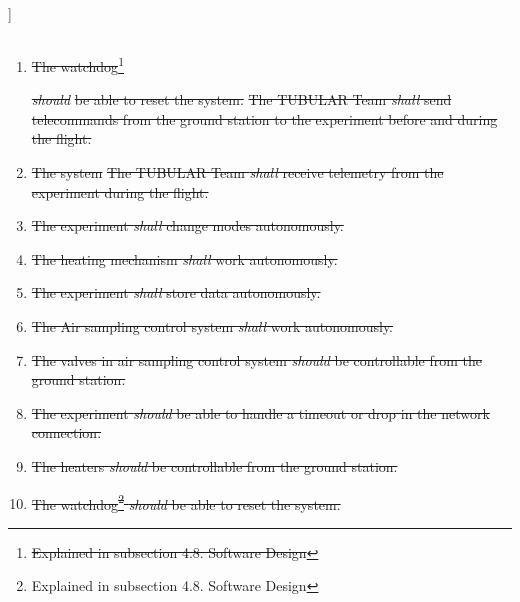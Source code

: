 ]\documentclass[a4paper,12pt,twoside]{article}
\providecommand{\DIFaddtex}[1]{{\protect\color{blue}\uwave{#1}}} %
\providecommand{\DIFdeltex}[1]{{\protect\color{red}\sout{#1}}}                      %
\providecommand{\DIFaddbegin}{} %
\providecommand{\DIFaddend}{} %
\providecommand{\DIFdelbegin}{} %
\providecommand{\DIFdelend}{} %
\providecommand{\DIFadd}[1]{\texorpdfstring{\DIFaddtex{#1}}{#1}} %
\providecommand{\DIFdel}[1]{\texorpdfstring{\DIFdeltex{#1}}{}} %
\newcommand{\DIFscaledelfig}{0.5}
\newlength{\DIFdelgraphicswidth} %
\newlength{\DIFdelgraphicsheight} %
\newcommand{\DIFaddincludegraphics}[2][]{{\color{blue}\fbox{\DIFOincludegraphics[#1]{#2}}}} %
\newcommand{\DIFdelincludegraphics}[2][]{%
\sbox{\DIFdelgraphicsbox}{\DIFOincludegraphics[#1]{#2}}%
\settoboxwidth{\DIFdelgraphicswidth}{\DIFdelgraphicsbox} %
\settoboxtotalheight{\DIFdelgraphicsheight}{\DIFdelgraphicsbox} %
\scalebox{\DIFscaledelfig}{%
\parbox[b]{\DIFdelgraphicswidth}{\usebox{\DIFdelgraphicsbox}\\[-\baselineskip] \rule{\DIFdelgraphicswidth}{0em}}\llap{\resizebox{\DIFdelgraphicswidth}{\DIFdelgraphicsheight}{%
\setlength{\unitlength}{\DIFdelgraphicswidth}%
\begin{picture}(1,1)%
\thicklines\linethickness{2pt} %
{\color[rgb]{1,0,0}\put(0,0){\framebox(1,1){}}}%
{\color[rgb]{1,0,0}\put(0,0){\line( 1,1){1}}}%
{\color[rgb]{1,0,0}\put(0,1){\line(1,-1){1}}}%
\end{picture}%
}\hspace*{3pt}}} %
} %
\DeclareRobustCommand{\DIFaddbegin}{\DIFOaddbegin \let\includegraphics\DIFaddincludegraphics} %
\DeclareRobustCommand{\DIFaddend}{\DIFOaddend \let\includegraphics\DIFOincludegraphics} %
\DeclareRobustCommand{\DIFdelbegin}{\DIFOdelbegin \let\includegraphics\DIFdelincludegraphics} %
\DeclareRobustCommand{\DIFdelend}{\DIFOaddend \let\includegraphics\DIFOincludegraphics} %
\begin{document}
\subsection{\DIFadd{Operational Requirements}}

\begin{enumerate}[label=O.\arabic*]
    \DIFaddend \item \DIFdelbegin \DIFdel{The watchdog}\footnote{\DIFdel{Explained in subsection 4.8. Software Design}} %
\addtocounter{footnote}{-1}%
\textit{\DIFdel{should}} %
\DIFdel{be able to reset the system.
    }\DIFdelend \DIFaddbegin \st{The TUBULAR Team \textit{shall} send telecommands from the ground station to the experiment before and during the flight.}\DIFadd{\textsuperscript{\ref{fn:unnecessary-requirement}}
    }\DIFaddend \item \DIFdelbegin \DIFdel{The system }\DIFdelend \DIFaddbegin \st{The TUBULAR Team \textit{shall} receive telemetry from the experiment during the flight.}\DIFadd{\textsuperscript{\ref{fn:unnecessary-requirement}}
    }\item \st{The experiment \textit{shall} change modes autonomously.}\DIFadd{\textsuperscript{\ref{fn:unnecessary-requirement}}
    }\item \st{The heating mechanism \textit{shall} work autonomously.}\DIFadd{\textsuperscript{\ref{fn:unnecessary-requirement}}
    }\item \st{The experiment \textit{shall} store data autonomously.}\DIFadd{\textsuperscript{\ref{fn:unnecessary-requirement}}
    }\item \st{The Air sampling control system \textit{shall} work autonomously.}\DIFadd{\textsuperscript{\ref{fn:unnecessary-requirement}}
    }\item \st{The valves in air sampling control system \textit{should} be controllable from the ground station.}\DIFadd{\textsuperscript{\ref{fn:unnecessary-requirement}}
    }\item \st{The experiment \textit{should} be able to handle a timeout or drop in the network connection.}\DIFadd{\textsuperscript{\ref{fn:unnecessary-requirement}}
    }\item \st{The heaters \textit{should} be controllable from the ground station.}\DIFadd{\textsuperscript{\ref{fn:unnecessary-requirement}}
    }\item \st{The watchdog\footnote{Explained in subsection 4.8. Software Design} \textit{should} be able to reset the system.}\DIFadd{\textsuperscript{\ref{fn:unnecessary-requirement}}
}
\end{enumerate}
\end{document}
